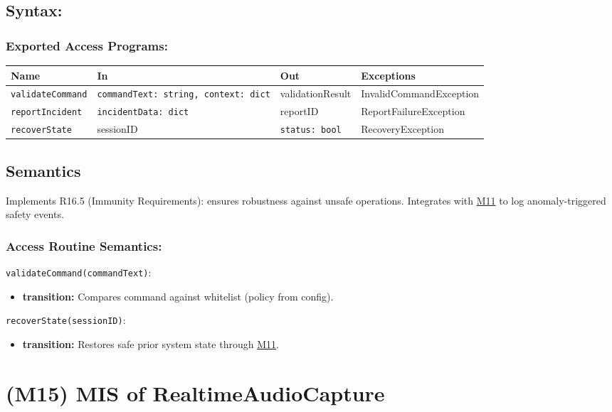 \documentclass[12pt, titlepage]{article}
\begin{document}
\subsection{Syntax:}

\subsubsection{Exported Access Programs:}

\begin{tabular}{|l|l|l|l|}
\hline
\textbf{Name} & \textbf{In} & \textbf{Out} & \textbf{Exceptions} \\ \hline
\texttt{validateCommand} & \texttt{commandText: string, context: dict} & validationResult & InvalidCommandException \\ 
\texttt{reportIncident} & \texttt{incidentData: dict} & reportID & ReportFailureException \\ 
\texttt{recoverState} & sessionID & \texttt{status: bool} & RecoveryException \\ \hline
\end{tabular}

\subsection{Semantics}

Implements R16.5 (Immunity Requirements): ensures robustness against unsafe operations.
Integrates with \hyperref[M11]{M11} to log anomaly-triggered safety events.

\subsubsection{Access Routine Semantics:}

\noindent\texttt{validateCommand(commandText)}:
\begin{itemize}
\item \textbf{transition:} Compares command against whitelist (policy from config).
\end{itemize}

\noindent\texttt{recoverState(sessionID)}:
\begin{itemize}
\item \textbf{transition:} Restores safe prior system state through \hyperref[M11]{M11}.
\end{itemize}



\section{(M15) MIS of RealtimeAudioCapture} \label{M15}
\end{document}

